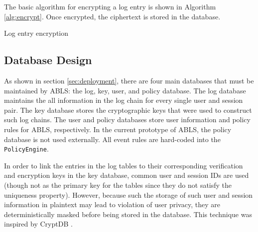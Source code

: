 \documentclass{sig-alternate}
\begin{document}
The basic algorithm for encrypting a log entry is shown in Algorithm \ref{alg:encrypt}. Once encrypted, the ciphertext
is stored in the database.
  
\begin{algorithm}[ht!] %
\caption{Log entry encryption} \label{alg:encrypt}
\begin{algorithmic}[1]

\ELSE
\ENDIF
{}
\end{algorithmic}
\end{algorithm}

\subsection{Database Design}
\label{sec:databaseDesign}
As shown in section \ref{sec:deployment}, there are four main databases that must be maintained by ABLS:
the log, key, user, and policy database. The log database maintains the all information in the log chain for every 
single user and session pair. The key database stores the cryptographic keys that were used to construct
such log chains. The user and policy databases store user information and policy rules for ABLS, respectively. 
In the current prototype of ABLS, the policy database is not used externally. All event rules are hard-coded into
the {\tt PolicyEngine}. 

In order to link the entries in the log tables to their corresponding verification and encryption keys in the key database,
common user and session IDs are used (though not as the primary key for the tables since they do not satisfy
the uniqueness property). However, because such the storage of such user and session information in plaintext
may lead to violation of user privacy, they are deterministically masked before being stored in the database. This technique
was inspired by CryptDB \cite{Popa2012-CryptDB}.
\end{document}

